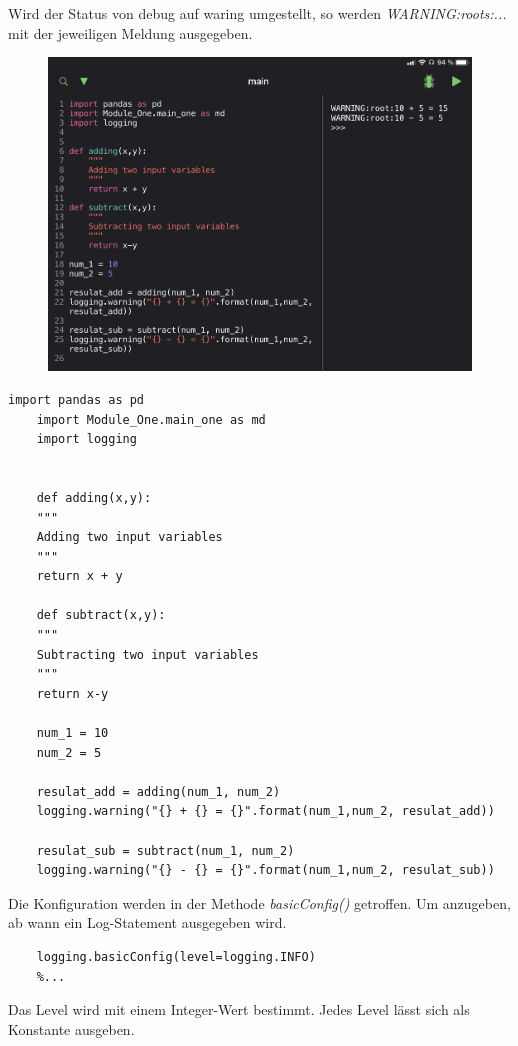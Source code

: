 Wird der Status von debug auf waring umgestellt, so werden \textit{WARNING:roots:...} mit der jeweiligen Meldung ausgegeben.

\begin{figure}[H]
	\centering
	\includegraphics[scale = 0.5]{attachment/chapter_4/Scc025}
\end{figure}

\begin{lstlisting}[style=python]
	import pandas as pd
	import Module_One.main_one as md
	import logging
	
	
	def adding(x,y):
	"""
	Adding two input variables
	"""
	return x + y 
	
	def subtract(x,y):
	"""
	Subtracting two input variables
	"""
	return x-y
	
	num_1 = 10
	num_2 = 5
	
	resulat_add = adding(num_1, num_2)
	logging.warning("{} + {} = {}".format(num_1,num_2, resulat_add))
	
	resulat_sub = subtract(num_1, num_2)
	logging.warning("{} - {} = {}".format(num_1,num_2, resulat_sub))
\end{lstlisting}

Die Konfiguration werden in der Methode \textit{basicConfig()} getroffen. Um anzugeben, ab wann ein Log-Statement ausgegeben wird.
\begin{lstlisting}[style=python]
	%...
	logging.basicConfig(level=logging.INFO)
	%...
\end{lstlisting}
Das Level wird mit einem Integer-Wert bestimmt. Jedes Level lässt sich als Konstante ausgeben.

